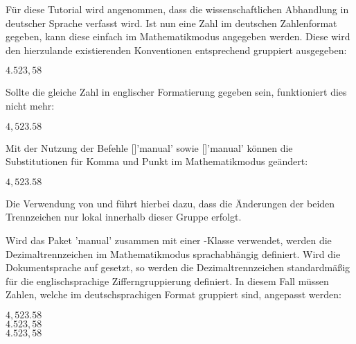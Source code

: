 \documentclass[english,ngerman]{tudscrartcl}
\begin{document}
\begin{Bundle}{}
Für diese Tutorial wird angenommen, dass die wissenschaftlichen Abhandlung in 
deutscher Sprache verfasst wird. Ist nun eine Zahl im deutschen Zahlenformat 
gegeben, kann diese einfach im Mathematikmodus angegeben werden. Diese wird 
den hierzulande existierenden Konventionen entsprechend gruppiert ausgegeben:
%
\begin{Trunk*}
\(4.523,58\)

\end{Trunk*}
%
Sollte die gleiche Zahl in englischer Formatierung gegeben sein, funktioniert 
dies nicht mehr:
%
\begin{Trunk*}
\(4,523.58\)

\end{Trunk*}
%
Mit der Nutzung der Befehle [\PParameter{\Macro*{,}}]'manual'
sowie [\PParameter{,}]'manual' können die Substitutionen für 
Komma und Punkt im Mathematikmodus geändert:
%
\begin{Trunk*}
\begingroup
  \commaswap{\,}
  \dotswap{,}
  \(4,523.58\)
\endgroup

\end{Trunk*}
%
Die Verwendung von  und  führt hierbei 
dazu, dass die Änderungen der beiden Trennzeichen nur lokal innerhalb dieser 
Gruppe erfolgt.

Wird das Paket 'manual' zusammen mit einer \TUDScript-Klasse 
verwendet, werden die Dezimaltrennzeichen im Mathematikmodus sprachabhängig 
definiert. Wird die Dokumentsprache auf  gesetzt, so werden die
Dezimaltrennzeichen standardmäßig für die englischsprachige Zifferngruppierung 
definiert. In diesem Fall müssen Zahlen, welche im deutschsprachigen Format 
gruppiert sind, angepasst werden:
%
\begin{Trunk*}
\begingroup
  \(4,523.58\)\\
  \(4.523,58\)\\
  \dotswap{\,}
  \(4.523,58\)
\endgroup
\end{Trunk*}
%
\FinishTutorial
\ListOfToDo
\end{Bundle}
\end{document}

